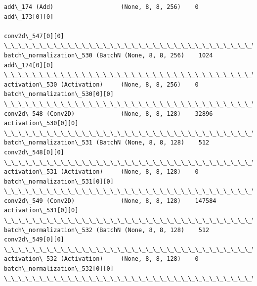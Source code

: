 \documentclass[11pt]{article}
\begin{document}
\begin{Verbatim}[commandchars=\\\{\}]
add\_174 (Add)                   (None, 8, 8, 256)    0           add\_173[0][0]                    
                                                                 conv2d\_547[0][0]                 
\_\_\_\_\_\_\_\_\_\_\_\_\_\_\_\_\_\_\_\_\_\_\_\_\_\_\_\_\_\_\_\_\_\_\_\_\_\_\_\_\_\_\_\_\_\_\_\_\_\_\_\_\_\_\_\_\_\_\_\_\_\_\_\_\_\_\_\_\_\_\_\_\_\_\_\_\_\_\_\_\_\_\_\_\_\_\_\_\_\_\_\_\_\_\_\_\_\_
batch\_normalization\_530 (BatchN (None, 8, 8, 256)    1024        add\_174[0][0]                    
\_\_\_\_\_\_\_\_\_\_\_\_\_\_\_\_\_\_\_\_\_\_\_\_\_\_\_\_\_\_\_\_\_\_\_\_\_\_\_\_\_\_\_\_\_\_\_\_\_\_\_\_\_\_\_\_\_\_\_\_\_\_\_\_\_\_\_\_\_\_\_\_\_\_\_\_\_\_\_\_\_\_\_\_\_\_\_\_\_\_\_\_\_\_\_\_\_\_
activation\_530 (Activation)     (None, 8, 8, 256)    0           batch\_normalization\_530[0][0]    
\_\_\_\_\_\_\_\_\_\_\_\_\_\_\_\_\_\_\_\_\_\_\_\_\_\_\_\_\_\_\_\_\_\_\_\_\_\_\_\_\_\_\_\_\_\_\_\_\_\_\_\_\_\_\_\_\_\_\_\_\_\_\_\_\_\_\_\_\_\_\_\_\_\_\_\_\_\_\_\_\_\_\_\_\_\_\_\_\_\_\_\_\_\_\_\_\_\_
conv2d\_548 (Conv2D)             (None, 8, 8, 128)    32896       activation\_530[0][0]             
\_\_\_\_\_\_\_\_\_\_\_\_\_\_\_\_\_\_\_\_\_\_\_\_\_\_\_\_\_\_\_\_\_\_\_\_\_\_\_\_\_\_\_\_\_\_\_\_\_\_\_\_\_\_\_\_\_\_\_\_\_\_\_\_\_\_\_\_\_\_\_\_\_\_\_\_\_\_\_\_\_\_\_\_\_\_\_\_\_\_\_\_\_\_\_\_\_\_
batch\_normalization\_531 (BatchN (None, 8, 8, 128)    512         conv2d\_548[0][0]                 
\_\_\_\_\_\_\_\_\_\_\_\_\_\_\_\_\_\_\_\_\_\_\_\_\_\_\_\_\_\_\_\_\_\_\_\_\_\_\_\_\_\_\_\_\_\_\_\_\_\_\_\_\_\_\_\_\_\_\_\_\_\_\_\_\_\_\_\_\_\_\_\_\_\_\_\_\_\_\_\_\_\_\_\_\_\_\_\_\_\_\_\_\_\_\_\_\_\_
activation\_531 (Activation)     (None, 8, 8, 128)    0           batch\_normalization\_531[0][0]    
\_\_\_\_\_\_\_\_\_\_\_\_\_\_\_\_\_\_\_\_\_\_\_\_\_\_\_\_\_\_\_\_\_\_\_\_\_\_\_\_\_\_\_\_\_\_\_\_\_\_\_\_\_\_\_\_\_\_\_\_\_\_\_\_\_\_\_\_\_\_\_\_\_\_\_\_\_\_\_\_\_\_\_\_\_\_\_\_\_\_\_\_\_\_\_\_\_\_
conv2d\_549 (Conv2D)             (None, 8, 8, 128)    147584      activation\_531[0][0]             
\_\_\_\_\_\_\_\_\_\_\_\_\_\_\_\_\_\_\_\_\_\_\_\_\_\_\_\_\_\_\_\_\_\_\_\_\_\_\_\_\_\_\_\_\_\_\_\_\_\_\_\_\_\_\_\_\_\_\_\_\_\_\_\_\_\_\_\_\_\_\_\_\_\_\_\_\_\_\_\_\_\_\_\_\_\_\_\_\_\_\_\_\_\_\_\_\_\_
batch\_normalization\_532 (BatchN (None, 8, 8, 128)    512         conv2d\_549[0][0]                 
\_\_\_\_\_\_\_\_\_\_\_\_\_\_\_\_\_\_\_\_\_\_\_\_\_\_\_\_\_\_\_\_\_\_\_\_\_\_\_\_\_\_\_\_\_\_\_\_\_\_\_\_\_\_\_\_\_\_\_\_\_\_\_\_\_\_\_\_\_\_\_\_\_\_\_\_\_\_\_\_\_\_\_\_\_\_\_\_\_\_\_\_\_\_\_\_\_\_
activation\_532 (Activation)     (None, 8, 8, 128)    0           batch\_normalization\_532[0][0]    
\_\_\_\_\_\_\_\_\_\_\_\_\_\_\_\_\_\_\_\_\_\_\_\_\_\_\_\_\_\_\_\_\_\_\_\_\_\_\_\_\_\_\_\_\_\_\_\_\_\_\_\_\_\_\_\_\_\_\_\_\_\_\_\_\_\_\_\_\_\_\_\_\_\_\_\_\_\_\_\_\_\_\_\_\_\_\_\_\_\_\_\_\_\_\_\_\_\_

\end{Verbatim}
\end{document}
